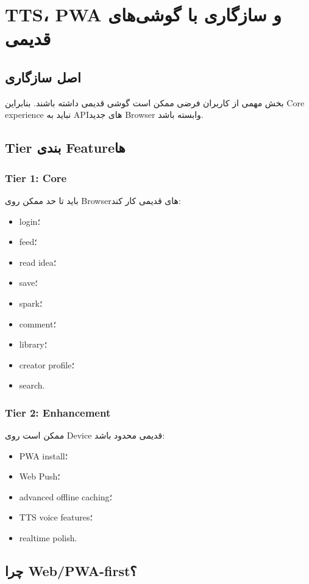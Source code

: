 
\chapter{TTS، PWA و سازگاری با گوشی‌های قدیمی}

\section{اصل سازگاری}

بخش مهمی از کاربران فرضی ممکن است گوشی قدیمی داشته باشند. بنابراین Core experience نباید به APIهای جدید Browser وابسته باشد.

\section{Tier بندی Featureها}

\subsection{Tier 1: Core}

باید تا حد ممکن روی Browserهای قدیمی کار کند:
\begin{itemize}
  \item login؛
  \item feed؛
  \item read idea؛
  \item save؛
  \item spark؛
  \item comment؛
  \item library؛
  \item creator profile؛
  \item search.
\end{itemize}

\subsection{Tier 2: Enhancement}

ممکن است روی Device قدیمی محدود باشد:
\begin{itemize}
  \item PWA install؛
  \item Web Push؛
  \item advanced offline caching؛
  \item TTS voice features؛
  \item realtime polish.
\end{itemize}

\section{چرا Web/PWA-first؟}

